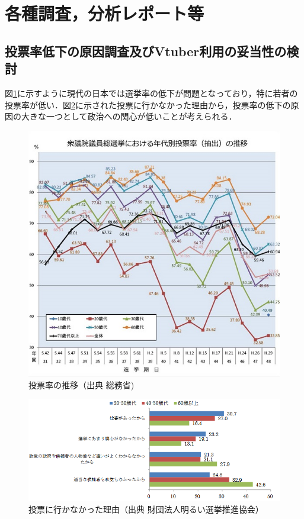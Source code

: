 \documentclass[a4paper,12pt]{jsarticle}
\begin{document}
\section{各種調査，分析レポート等}

\subsection{投票率低下の原因調査及びVtuber利用の妥当性の検討}

図\ref{fig:voterate}に示すように現代の日本では選挙率の低下が問題となっており，特に若者の投票率が低い．図\ref{fig:vote}に示された投票に行かなかった理由から，投票率の低下の原因の大きな一つとして政治への関心が低いことが考えられる．

\begin{figure}[H]
	\begin{center}
		\includegraphics[width=12.0cm]{fig/voterate.jpg}
		\caption{投票率の推移（出典 総務省\cite{vote1})}
		\label{fig:voterate}
	\end{center}
\end{figure}

\begin{figure}[H]
	\begin{center}
		\includegraphics[width=12.0cm]{fig/vote.png}
		\caption{投票に行かなかった理由（出典 財団法人明るい選挙推進協会\cite{vote2}）}
		\label{fig:vote}
	\end{center}
\end{figure}
\end{document}
